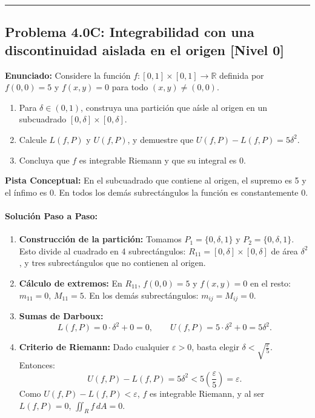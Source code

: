 \documentclass[11pt,a4paper]{article}
\begin{document}
\vspace{0.5cm}
\hrule
\vspace{0.5cm}
\subsection*{Problema 4.0C: Integrabilidad con una discontinuidad aislada en el origen \hfill \color{teal}\small[Nivel 0]}

\begin{tcolorbox}[colback=white,colframe=gray!40,arc=1mm,boxrule=0.5pt,left=3mm,right=3mm,top=2mm,bottom=2mm]
\textbf{Enunciado:} Considere la función $f: [0,1] \times [0,1] \to \mathbb{R}$ definida por $f(0,0) = 5$ y $f(x,y) = 0$ para todo $(x,y) \neq (0,0)$.
\begin{enumerate}[label=\textbf{\alph*)}]
\item Para $\delta \in (0,1)$, construya una partición que aísle al origen en un subcuadrado $[0,\delta] \times [0,\delta]$.
\item Calcule $L(f,P)$ y $U(f,P)$, y demuestre que $U(f,P) - L(f,P) = 5\delta^2$.
\item Concluya que $f$ es integrable Riemann y que su integral es 0.
\end{enumerate}
\end{tcolorbox}

\begin{tcolorbox}[colback=yellow!4,colframe=accentamber!70,arc=1mm,boxrule=0.5pt,left=3mm,right=3mm,top=1.5mm,bottom=1.5mm]
\textbf{Pista Conceptual:} En el subcuadrado que contiene al origen, el supremo es 5 y el ínfimo es 0. En todos los demás subrectángulos la función es constantemente 0.
\end{tcolorbox}

\paragraph{Solución Paso a Paso:}\par
\begin{enumerate}[label=\textbf{\arabic*.}]
\item \textbf{Construcción de la partición:}
Tomamos $P_1 = \{0, \delta, 1\}$ y $P_2 = \{0, \delta, 1\}$. Esto divide al cuadrado en 4 subrectángulos: $R_{11} = [0, \delta] \times [0, \delta]$ de área $\delta^2$, y tres subrectángulos que no contienen al origen.
\item \textbf{Cálculo de extremos:}
En $R_{11}$, $f(0,0) = 5$ y $f(x,y) = 0$ en el resto: $m_{11} = 0$, $M_{11} = 5$. En los demás subrectángulos: $m_{ij} = M_{ij} = 0$.
\item \textbf{Sumas de Darboux:}
\[ L(f,P) = 0 \cdot \delta^2 + 0 = 0, \qquad U(f,P) = 5 \cdot \delta^2 + 0 = 5\delta^2. \]
\item \textbf{Criterio de Riemann:}
Dado cualquier $\varepsilon > 0$, basta elegir $\delta < \sqrt{\frac{\varepsilon}{5}}$. Entonces:
\[ U(f,P) - L(f,P) = 5\delta^2 < 5\left(\frac{\varepsilon}{5}\right) = \varepsilon. \]
Como $U(f,P) - L(f,P) < \varepsilon$, $f$ es integrable Riemann, y al ser $L(f,P)=0$, $\iint_R f \, dA = 0$.
\end{enumerate}
\end{document}
